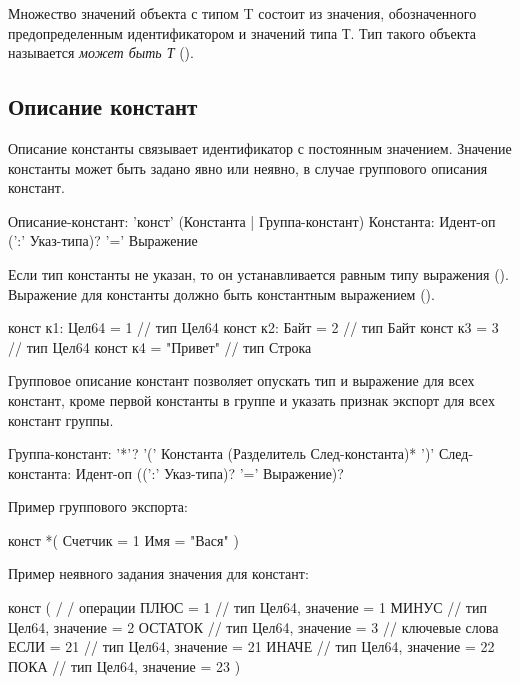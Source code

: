 Множество значений объекта с типом  T состоит из значения, обозначенного предопределенным идентификатором   и значений типа Т. 
Тип такого объекта называется \emph{может быть Т} (). 

\hypertarget{constants}{%
\subsection{Описание констант}\label{decls:constants}}

Описание константы связывает идентификатор с постоянным значением. 
Значение константы может быть задано явно или неявно, в случае группового описания констант.

\begin{Grammar}
Описание-констант: 'конст' (Константа | Группа-констант)
Константа: Идент-оп (':' Указ-типа)? '=' Выражение
\end{Grammar} 

Если тип константы не указан, то он устанавливается равным типу выражения ().
Выражение для константы должно быть константным выражением ().

\begin{Trivil}
конст к1: Цел64 = 1 // тип Цел64
конст к2: Байт = 2 // тип Байт
конст к3 = 3 // тип Цел64
конст к4 = "Привет" // тип Строка
\end{Trivil}

Групповое описание констант позволяет опускать тип и выражение для всех констант, кроме первой константы в группе и указать признак экспорт для всех констант группы.

\begin{Grammar}
Группа-констант: 
    '*'? '(' 
    Константа (Разделитель След-константа)* 
    ')'
След-константа: Идент-оп ((':' Указ-типа)? '=' Выражение)?
\end{Grammar} 

Пример группового экспорта:
\begin{Trivil}[vspace=2pt]
конст *(
    Счетчик = 1
    Имя = "Вася"
)
\end{Trivil}

Пример неявного задания значения для констант:
\begin{Trivil}[vspace=2pt]
конст ( 
    / / операции
    ПЛЮС = 1   // тип Цел64, значение = 1
    МИНУС       // тип Цел64, значение = 2  
    ОСТАТОК   // тип Цел64, значение = 3 
    // ключевые слова
    ЕСЛИ = 21   // тип Цел64, значение = 21
    ИНАЧЕ        // тип Цел64, значение = 22
    ПОКА          // тип Цел64, значение = 23
)
\end{Trivil}


